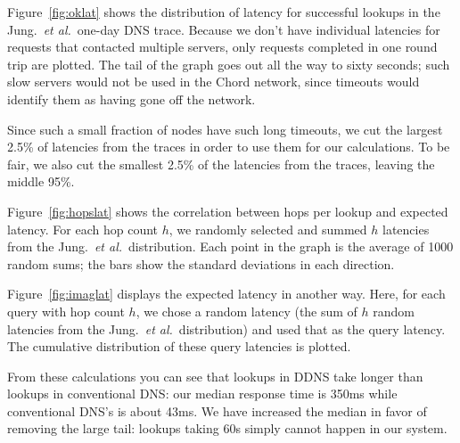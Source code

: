 Figure~\ref{fig:oklat} shows the distribution of latency
for successful lookups in the Jung.~{\em et al.}\ one-day DNS trace.
Because we don't have individual latencies for requests that 
contacted multiple servers, only requests completed in one
round trip are plotted.
The tail of the graph goes out all the way to sixty seconds;
such slow servers would not be used in the Chord network,
since timeouts would identify them as having gone off the network.

Since such a small fraction of nodes have such long timeouts,
we cut the largest 2.5\% of latencies from the traces in order
to use them for our calculations.
To be fair, we also cut the smallest 2.5\% of the latencies 
from the traces, leaving the middle 95\%.

Figure~\ref{fig:hopslat} shows the correlation between
hops per lookup and expected latency.
For each hop count $h$, we randomly selected and summed $h$ latencies
from the Jung.~{\em et al.}\ distribution.
Each point in the graph is the average of 1000 random sums;
the bars show the standard deviations in each direction.

Figure~\ref{fig:imaglat} displays the expected latency
in another way.
Here, for each query with hop count $h$, we chose a random
latency (the sum of $h$ random latencies from the Jung.~{\em et al.}\ distribution)
and used that as the query latency.
The cumulative distribution of these query latencies is plotted.

From these calculations you can see that lookups in DDNS take longer
than lookups in conventional DNS: our median response time is 350ms
while conventional DNS's is about 43ms.
We have increased the median in favor of removing the
large tail: lookups taking 60s simply cannot happen
in our system.






